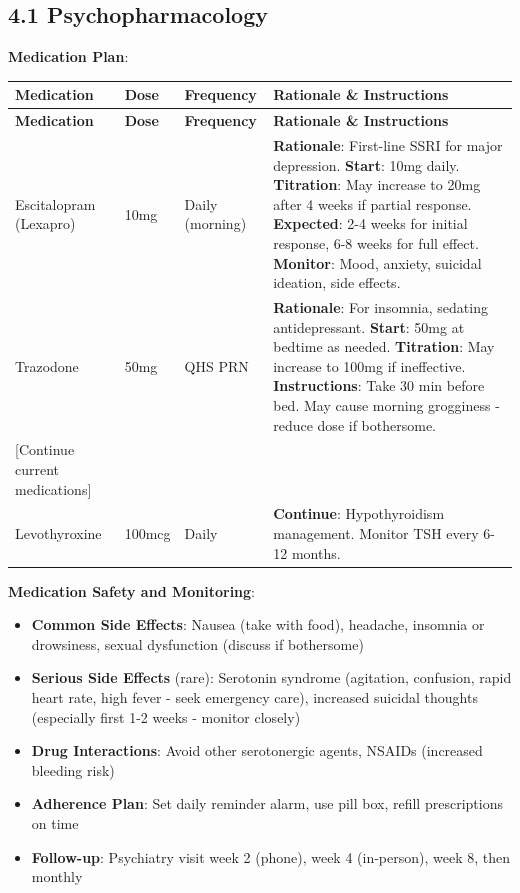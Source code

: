\documentclass[11pt,letterpaper]{article}
\begin{document}
\subsection*{4.1 Psychopharmacology}

\textbf{Medication Plan}:

\begin{longtable}{|p{3cm}|p{2cm}|p{2cm}|p{6.5cm}|}
\hline
\textbf{Medication} & \textbf{Dose} & \textbf{Frequency} & \textbf{Rationale \& Instructions} \\ \hline
\endfirsthead
\hline
\textbf{Medication} & \textbf{Dose} & \textbf{Frequency} & \textbf{Rationale \& Instructions} \\ \hline
\endhead

Escitalopram (Lexapro) & 10mg & Daily (morning) & \textbf{Rationale}: First-line SSRI for major depression. \textbf{Start}: 10mg daily. \textbf{Titration}: May increase to 20mg after 4 weeks if partial response. \textbf{Expected}: 2-4 weeks for initial response, 6-8 weeks for full effect. \textbf{Monitor}: Mood, anxiety, suicidal ideation, side effects. \\ \hline

Trazodone & 50mg & QHS PRN & \textbf{Rationale}: For insomnia, sedating antidepressant. \textbf{Start}: 50mg at bedtime as needed. \textbf{Titration}: May increase to 100mg if ineffective. \textbf{Instructions}: Take 30 min before bed. May cause morning grogginess - reduce dose if bothersome. \\ \hline

[Continue current medications] & & & \\ \hline
Levothyroxine & 100mcg & Daily & \textbf{Continue}: Hypothyroidism management. Monitor TSH every 6-12 months. \\ \hline
\end{longtable}

\textbf{Medication Safety and Monitoring}:
\begin{itemize}[leftmargin=*]
    \item \textbf{Common Side Effects}: Nausea (take with food), headache, insomnia or drowsiness, sexual dysfunction (discuss if bothersome)
    \item \textbf{Serious Side Effects} (rare): Serotonin syndrome (agitation, confusion, rapid heart rate, high fever - seek emergency care), increased suicidal thoughts (especially first 1-2 weeks - monitor closely)
    \item \textbf{Drug Interactions}: Avoid other serotonergic agents, NSAIDs (increased bleeding risk)
    \item \textbf{Adherence Plan}: Set daily reminder alarm, use pill box, refill prescriptions on time
    \item \textbf{Follow-up}: Psychiatry visit week 2 (phone), week 4 (in-person), week 8, then monthly
\end{itemize}
\end{document}
